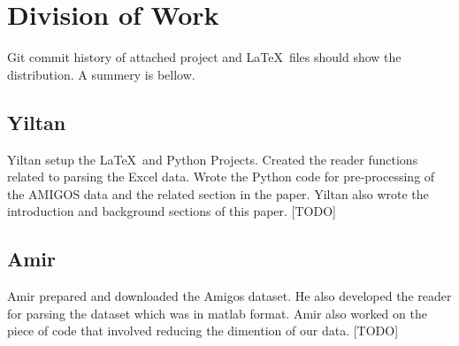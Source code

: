 \section{Division of Work}
\label{sec:division_of_work}
Git commit history of attached project and
\LaTeX~files should show the distribution.
A summery is bellow.

\subsection{Yiltan}
Yiltan setup the \LaTeX~and Python Projects.
Created the reader functions related to parsing the Excel data.
Wrote the Python code for pre-processing of the AMIGOS data
and the related section in the paper.
Yiltan also wrote the introduction and background sections of this paper.
[TODO]

\subsection{Amir}
Amir prepared and downloaded the Amigos dataset.
He also developed the reader for parsing the dataset
which was in matlab format.
Amir also worked on the piece of code that involved reducing the dimention of our data.
[TODO]
